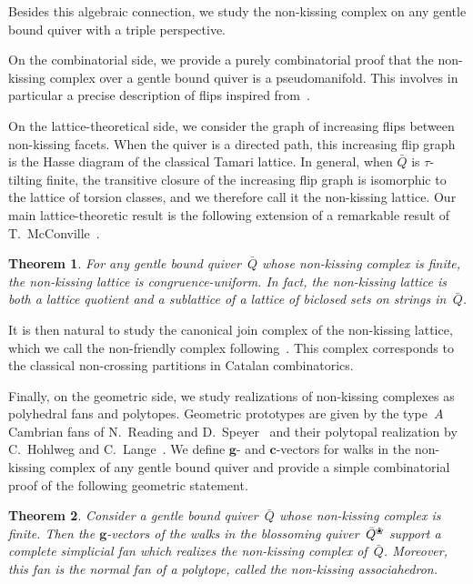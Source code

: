 \documentclass{amsart}
\newtheorem*{theorem*}{Theorem}%
\theoremstyle{definition}
\renewcommand{\b}[1]{\mathbf{#1}} %
\newcommand{\blossom}{^\text{\ding{96}}} %
\begin{document}
Besides this algebraic connection, we study the non-kissing complex on any gentle bound quiver with a triple perspective.

On the combinatorial side, we provide a purely combinatorial proof that the non-kissing complex over a gentle bound quiver is a pseudomanifold.
This involves in particular a precise description of flips inspired from~\cite[Sect.~3]{McConville}.

On the lattice-theoretical side, we consider the graph of increasing flips between non-kissing facets.
When the quiver is a directed path, this increasing flip graph is the Hasse diagram of the classical Tamari lattice.
In general, when $\bar Q$ is $\tau$-tilting finite, the transitive closure of the increasing flip graph is isomorphic to the lattice of torsion classes, and we therefore call it the non-kissing lattice.
Our main lattice-theoretic result is the following extension of a remarkable result of T.~McConville~\cite{McConville}.

\begin{theorem*}
For any gentle bound quiver~$\bar Q$ whose non-kissing complex is finite, the non-kissing lattice is congruence-uniform.
In fact, the non-kissing lattice is both a lattice quotient and a sublattice of a lattice of biclosed sets on strings in~$\bar Q$.
\end{theorem*}

\noindent
It is then natural to study the canonical join complex of the non-kissing lattice, which we call the non-friendly complex following~\cite{GarverMcConville-grid}.
This complex corresponds to the classical non-crossing partitions in Catalan combinatorics.

Finally, on the geometric side, we study realizations of non-kissing complexes as polyhedral fans and polytopes.
Geometric prototypes are given by the type~$A$ Cambrian fans of N.~Reading and D.~Speyer~\cite{ReadingSpeyer} and their polytopal realization by C.~Hohlweg and C.~Lange~\cite{HohlwegLange}.
We define $\b{g}$- and $\b{c}$-vectors for walks in the non-kissing complex of any gentle bound quiver and provide a simple combinatorial proof of the following geometric statement.

\begin{theorem*}
Consider a gentle bound quiver~$\bar Q$ whose non-kissing complex is finite.
Then the \mbox{$\b{g}$-vectors} of the walks in the blossoming quiver~$\bar Q\blossom$ support a complete simplicial fan which realizes the non-kissing complex of~$\bar Q$.
Moreover, this fan is the normal fan of a polytope, called the non-kissing associahedron.
\end{theorem*}
\end{document}
